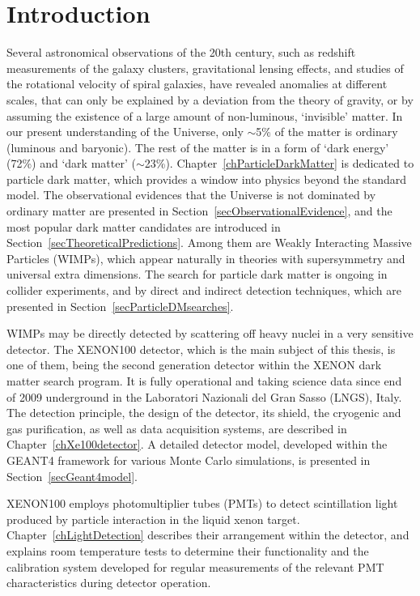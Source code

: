 \chapter{Introduction}
\label{chIntroduction}

Several astronomical observations of the 20th century, such as redshift measurements of the galaxy clusters, gravitational lensing effects, and studies of the rotational velocity of spiral galaxies, have revealed anomalies at different scales, that can only be explained by a deviation from the theory of gravity, or by assuming the existence of a large amount of non-luminous, `invisible' matter. In our present understanding of the Universe, only $\sim$5\% of the matter is ordinary (luminous and baryonic). The rest of the matter is in a form of `dark energy' (72\%) and `dark matter' ($\sim$23\%). Chapter~\ref{chParticleDarkMatter} is dedicated to particle dark matter, which provides a window into physics beyond the standard model. 
The observational evidences that the Universe is not dominated by ordinary matter are presented in Section~\ref{secObservationalEvidence}, and the most popular dark matter candidates are introduced in Section~\ref{secTheoreticalPredictions}. Among them are Weakly Interacting Massive Particles (WIMPs), which appear naturally in theories with supersymmetry and universal extra dimensions. The search for particle dark matter is ongoing  in collider experiments, and by direct and indirect detection techniques, which are presented in Section~\ref{secParticleDMsearches}.

WIMPs may be directly detected by scattering off heavy nuclei in a very sensitive detector. The XENON100 detector, which is the main subject of this thesis, is one of them, being the second generation detector within the XENON dark matter search program. 
It is fully operational and taking science data since end of 2009 underground in the Laboratori Nazionali del Gran Sasso (LNGS), Italy. The detection principle, the design of the detector, its shield, the cryogenic and gas purification, as well as data acquisition systems, are described in Chapter~\ref{chXe100detector}. A detailed detector model, developed within the GEANT4 framework for various Monte Carlo simulations, is presented in Section~\ref{secGeant4model}.

XENON100 employs photomultiplier tubes (PMTs) to detect scintillation light produced by particle interaction in the liquid xenon target. Chapter~\ref{chLightDetection} describes their arrangement within the detector, and explains room temperature tests to determine their functionality and the calibration system developed for regular measurements of the relevant PMT characteristics during detector operation.

